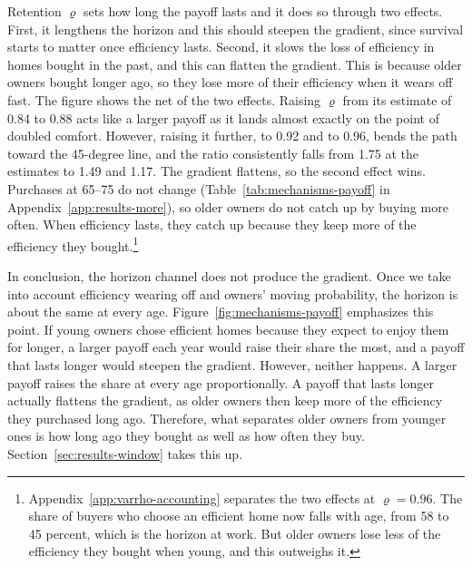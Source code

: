 Retention $\varrho$ sets how long the payoff lasts and it does so through two effects. First,
it lengthens the horizon and this should steepen the gradient, since survival
starts to matter once efficiency lasts.
Second, it slows the loss of efficiency in homes bought in the past, and this
can flatten the gradient. This is because older owners bought longer ago, so they lose
more of their efficiency when it wears off fast. The figure shows the net of the two
effects. Raising $\varrho$ from its estimate of 0.84 to 0.88 acts like a
larger payoff as  it lands almost exactly on the point of doubled comfort. However, raising it further,
to 0.92 and to 0.96, bends the path toward the  45-degree line, and the ratio
consistently falls from  1.75 at the estimates to 1.49 and 1.17.  The
gradient flattens, so the second effect wins. Purchases at 65--75 do not
change (Table~\ref{tab:mechanisms-payoff} in
Appendix~\ref{app:results-more}), so older owners do not catch up by buying
more often. When efficiency lasts, they catch up because they keep more of
the efficiency they bought.\footnote{Appendix~\ref{app:varrho-accounting} separates the two effects at
$\varrho=0.96$. The share of buyers who choose an efficient home now falls
with age, from 58 to 45 percent, which is the horizon at work. But older
owners lose less of the efficiency they bought when young, and this
outweighs it.}

 In conclusion, the  horizon channel does not produce the gradient. Once we take into account
efficiency wearing off and owners' moving probability, the horizon is about the same at every
age. Figure~\ref{fig:mechanisms-payoff} emphasizes this point. If young owners
chose efficient homes because they expect to enjoy them for longer, a larger
payoff each year would raise their share the most, and a payoff that lasts
longer would steepen the gradient. However, neither happens. A larger payoff raises
the share at every age proportionally. A payoff that lasts
longer actually flattens the gradient, as older owners then keep more of the
efficiency they purchased long ago. Therefore, what separates older owners from younger
ones is how long ago they bought as well as how often they buy.
Section~\ref{sec:results-window} takes this up.


